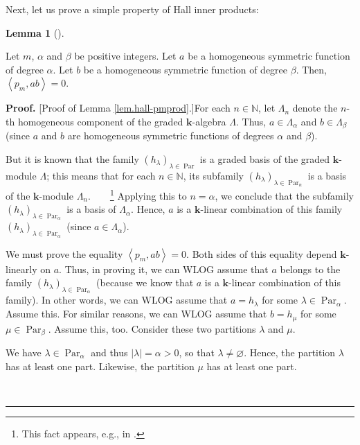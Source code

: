 \documentclass[numbers=enddot,12pt,final,onecolumn,notitlepage]{scrartcl}%
\theoremstyle{definition}
\newtheorem{lem}[theo]{Lemma}
\newenvironment{lemma}[1][]
{\begin{lem}[#1]\begin{leftbar}}
{\end{leftbar}\end{lem}}
\newenvironment{proof}[1][Proof]{\noindent\textbf{#1.} }{\ \rule{0.5em}{0.5em}}
\newenvironment{vershort}{}{}
\begin{document}
Next, let us prove a simple property of Hall inner products:

\begin{lemma}
\label{lem.hall-pmprod}Let $m$, $\alpha$ and $\beta$ be positive integers. Let
$a$ be a homogeneous symmetric function of degree $\alpha$. Let $b$ be a
homogeneous symmetric function of degree $\beta$. Then, $\left\langle
p_{m},ab\right\rangle =0$.
\end{lemma}

\begin{vershort}
\begin{proof}
[Proof of Lemma \ref{lem.hall-pmprod}.]For each $n\in\mathbb{N}$, let
$\Lambda_{n}$ denote the $n$-th homogeneous component of the graded
$\mathbf{k}$-algebra $\Lambda$. Thus, $a\in\Lambda_{\alpha}$ and $b\in
\Lambda_{\beta}$ (since $a$ and $b$ are homogeneous symmetric functions of
degrees $\alpha$ and $\beta$).

But it is known that the family $\left(  h_{\lambda}\right)  _{\lambda
\in\operatorname*{Par}}$ is a graded basis of the graded $\mathbf{k}$-module
$\Lambda$; this means that for each $n\in\mathbb{N}$, its subfamily $\left(
h_{\lambda}\right)  _{\lambda\in\operatorname*{Par}\nolimits_{n}}$ is a basis
of the $\mathbf{k}$-module $\Lambda_{n}$.\ \ \ \ \footnote{This fact appears,
e.g., in \cite[Proposition 2.4.3(j)]{GriRei}.} Applying this to $n=\alpha$, we
conclude that the subfamily $\left(  h_{\lambda}\right)  _{\lambda
\in\operatorname*{Par}\nolimits_{\alpha}}$ is a basis of $\Lambda_{\alpha}$.
Hence, $a$ is a $\mathbf{k}$-linear combination of this family $\left(
h_{\lambda}\right)  _{\lambda\in\operatorname*{Par}\nolimits_{\alpha}}$ (since
$a\in\Lambda_{\alpha}$).

We must prove the equality $\left\langle p_{m},ab\right\rangle =0$. Both sides
of this equality depend $\mathbf{k}$-linearly on $a$. Thus, in proving it, we
can WLOG assume that $a$ belongs to the family $\left(  h_{\lambda}\right)
_{\lambda\in\operatorname*{Par}\nolimits_{\alpha}}$ (because we know that $a$
is a $\mathbf{k}$-linear combination of this family). In other words, we can
WLOG assume that $a=h_{\lambda}$ for some $\lambda\in\operatorname*{Par}%
\nolimits_{\alpha}$. Assume this. For similar reasons, we can WLOG assume that
$b=h_{\mu}$ for some $\mu\in\operatorname*{Par}\nolimits_{\beta}$. Assume
this, too. Consider these two partitions $\lambda$ and $\mu$.

We have $\lambda\in\operatorname*{Par}\nolimits_{\alpha}$ and thus $\left\vert
\lambda\right\vert =\alpha>0$, so that $\lambda\neq\varnothing$. Hence, the
partition $\lambda$ has at least one part. Likewise, the partition $\mu$ has
at least one part.


\end{proof}
\end{vershort}
\end{document}
